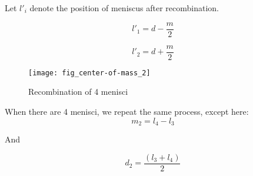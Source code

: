 	Let ${l'}_i$ denote the position of meniscus after recombination.
	
	\begin{equation}
		{l'}_1 = d - \frac{m}{2}
	\end{equation}
	
	\begin{equation}
		{l'}_2 = d + \frac{m}{2}
	\end{equation}
	

	\begin{figure}[H]
		\centering
		\texttt{[image: fig\_center-of-mass\_2]}
		\caption{Recombination of 4 menisci}
	\end{figure}
	
	When there are 4 menisci, we repeat the same process, except here:
	\begin{equation}
		m_2 = l_4 - l_3
	\end{equation}
	
	And
	
	\begin{equation}	
		d_2 = \frac{(l_3 + l_4)}{2}
	\end{equation}
